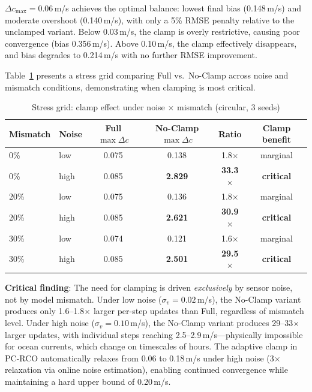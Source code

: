 $\Delta c_{\max}=0.06$\,m/s achieves the optimal balance: lowest final bias (0.148\,m/s) and moderate overshoot (0.140\,m/s), with only a 5\% RMSE penalty relative to the unclamped variant. Below 0.03\,m/s, the clamp is overly restrictive, causing poor convergence (bias 0.356\,m/s). Above 0.10\,m/s, the clamp effectively disappears, and bias degrades to 0.214\,m/s with no further RMSE improvement.

Table~\ref{tab:stress_grid} presents a stress grid comparing Full vs.\ No-Clamp across noise and mismatch conditions, demonstrating when clamping is most critical.

\begin{table}[h]
\centering
\caption{Stress grid: clamp effect under noise $\times$ mismatch (circular, 3 seeds)}
\label{tab:stress_grid}
\begin{tabular}{llccc|c}
\toprule
Mismatch & Noise & Full $\max\Delta c$ & No-Clamp $\max\Delta c$ & Ratio & Clamp benefit \\
\midrule
0\%  & low  & 0.075 & 0.138 & 1.8$\times$ & marginal \\
0\%  & high & 0.085 & \textbf{2.829} & \textbf{33.3$\times$} & \textbf{critical} \\
20\% & low  & 0.075 & 0.136 & 1.8$\times$ & marginal \\
20\% & high & 0.085 & \textbf{2.621} & \textbf{30.9$\times$} & \textbf{critical} \\
30\% & low  & 0.074 & 0.121 & 1.6$\times$ & marginal \\
30\% & high & 0.085 & \textbf{2.501} & \textbf{29.5$\times$} & \textbf{critical} \\
\bottomrule
\end{tabular}
\end{table}

\textbf{Critical finding}: The need for clamping is driven \emph{exclusively} by sensor noise, not by model mismatch. Under low noise ($\sigma_v=0.02$\,m/s), the No-Clamp variant produces only 1.6--1.8$\times$ larger per-step updates than Full, regardless of mismatch level. Under high noise ($\sigma_v=0.10$\,m/s), the No-Clamp variant produces 29--33$\times$ larger updates, with individual steps reaching 2.5--2.9\,m/s---physically impossible for ocean currents, which change on timescales of hours. The adaptive clamp in PC-RCO automatically relaxes from 0.06 to 0.18\,m/s under high noise (3$\times$ relaxation via online noise estimation), enabling continued convergence while maintaining a hard upper bound of 0.20\,m/s.


